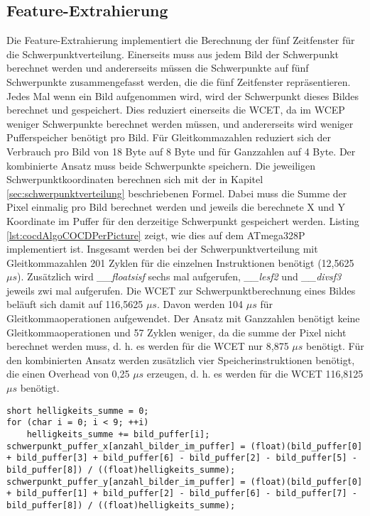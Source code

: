 \subsection{Feature-Extrahierung}
Die Feature-Extrahierung implementiert die Berechnung der fünf Zeitfenster für die Schwerpunktverteilung. Einerseits muss aus jedem Bild der Schwerpunkt berechnet werden und andererseits müssen die Schwerpunkte
auf fünf Schwerpunkte zusammengefasst werden, die die fünf Zeitfenster repräsentieren.
\newline
\newline
Jedes Mal wenn ein Bild aufgenommen wird, wird der Schwerpunkt dieses Bildes berechnet und gespeichert. Dies reduziert einerseits die WCET, da im WCEP weniger Schwerpunkte berechnet werden müssen, und andererseits
wird weniger Pufferspeicher benötigt pro Bild. Für Gleitkommazahlen reduziert sich der Verbrauch pro Bild von 18 Byte auf 8 Byte und für Ganzzahlen auf 4 Byte. Der kombinierte Ansatz muss beide Schwerpunkte speichern.
Die jeweiligen Schwerpunktkoordinaten berechnen sich mit der in Kapitel \ref{sec:schwerpunktverteilung} beschriebenen Formel. Dabei muss die Summe der Pixel einmalig pro Bild berechnet werden und jeweils die
berechnete X und Y Koordinate im Puffer für den derzeitige Schwerpunkt gespeichert werden. Listing \ref{lst:cocdAlgoCOCDPerPicture} zeigt, wie dies auf dem ATmega328P implementiert ist. Insgesamt werden bei der
Schwerpunktverteilung mit Gleitkommazahlen 201 Zyklen für die einzelnen Instruktionen benötigt (12,5625 $\mu s$). Zusätzlich wird \textit{\_\_floatsisf} sechs mal aufgerufen, \textit{\_\_lesf2} und \textit{\_\_divsf3}
jeweils zwi mal aufgerufen. Die WCET zur Schwerpunktberechnung eines Bildes beläuft sich damit auf 116,5625 $\mu s$. Davon werden 104 $\mu s$ für Gleitkommaoperationen aufgewendet. Der Ansatz mit Ganzzahlen benötigt
keine Gleitkommaoperationen und 57 Zyklen weniger, da die summe der Pixel nicht berechnet werden muss, d. h. es werden für die WCET nur 8,875 $\mu s$ benötigt. Für den kombinierten Ansatz werden zusätzlich vier
Speicherinstruktionen benötigt, die einen Overhead von 0,25 $\mu s$ erzeugen, d. h. es werden für die WCET 116,8125 $\mu s$ benötigt.
\begin{lstlisting}[label=lst:cocdAlgoCOCDPerPicture,caption={Implementierung um den Schwerpunkt für ein Bild zu berechnen.}]
short helligkeits_summe = 0;
for (char i = 0; i < 9; ++i)
    helligkeits_summe += bild_puffer[i];
schwerpunkt_puffer_x[anzahl_bilder_im_puffer] = (float)(bild_puffer[0] + bild_puffer[3] + bild_puffer[6] - bild_puffer[2] - bild_puffer[5] - bild_puffer[8]) / ((float)helligkeits_summe);
schwerpunkt_puffer_y[anzahl_bilder_im_puffer] = (float)(bild_puffer[0] + bild_puffer[1] + bild_puffer[2] - bild_puffer[6] - bild_puffer[7] - bild_puffer[8]) / ((float)helligkeits_summe);
\end{lstlisting}
